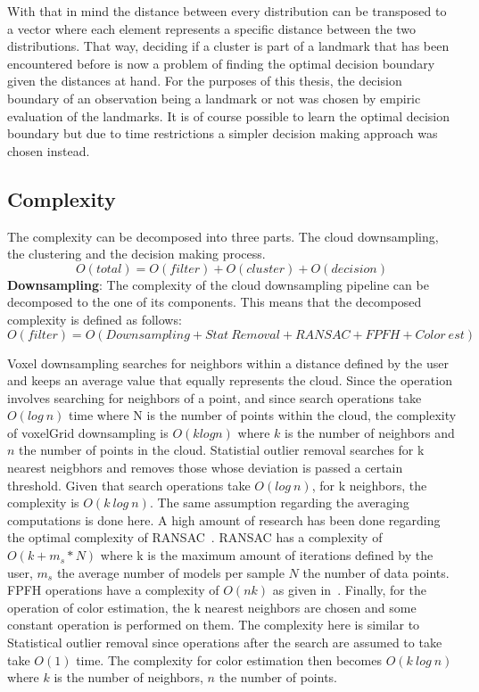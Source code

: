 \documentclass[twoside,hidelinks]{article}
\begin{document}
With that in mind the distance between every distribution can be transposed to a vector where each element represents a specific distance between the two distributions. That way, deciding if a cluster is part of a landmark that has been encountered before is now a problem of finding the optimal decision boundary given the distances at hand. For the purposes of this thesis, the decision boundary of an observation being a landmark or not was chosen by empiric evaluation of the landmarks. It is of course possible to learn the optimal decision boundary but due to time restrictions a simpler decision making approach was chosen instead.

\subsection{Complexity}

The complexity can be decomposed into three parts. The cloud downsampling, the clustering and the decision making process.
$$
O(total) = O(filter) + O(cluster) + O(decision)
$$
\textbf{Downsampling}: The complexity of the cloud downsampling pipeline can be decomposed to the one of its components. This means that the decomposed complexity is defined as follows:
$$O(filter) = O(Downsampling + Stat\ Removal + RANSAC+ FPFH + Color\ est) $$

Voxel downsampling searches for neighbors within a distance defined by the user and keeps an average value that equally represents the cloud. Since the operation involves searching for neighbors of a point, and since search operations take $O(log\ n)$ time where N is the number of points within the cloud, the complexity of voxelGrid downsampling is $O(k log n)$ where $k$ is the number of neighbors and $n$ the number of points in the cloud. 
Statistial outlier removal searches for k nearest neigbhors and removes those whose deviation is passed a certain threshold. Given that search operations take $O(log\ n)$, for k neighbors, the complexity is $O(k\ log\ n)$. The same assumption regarding the averaging computations is done here.
A high amount of research has been done regarding the optimal complexity of RANSAC~\cite{RANSAC}. RANSAC has a complexity of $ O(k+ m_s*N)$ where k is the maximum amount of iterations defined by the user, $m_s$ the average number of models per sample $N$ the number of data points.
FPFH operations have a complexity of $O(nk)$ as given in~\cite{fpfh}.
Finally, for the operation of color estimation, the k nearest neighbors are chosen and some constant operation is performed on them. The complexity here is similar to Statistical outlier removal since operations after the search are assumed to take take $O(1)$ time. The complexity for color estimation then becomes $O(k\ log\ n)$ where $k$ is the number of neighbors, $n$ the number of points. 
\end{document}
